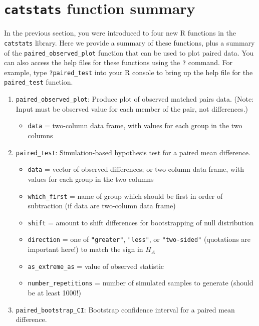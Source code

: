 \documentclass[
  10pt,
  openany]{book}
\providecommand{\tightlist}{%
  \setlength{\itemsep}{0pt}\setlength{\parskip}{0pt}}
\theoremstyle{definition}
\theoremstyle{definition}
\theoremstyle{definition}
\theoremstyle{definition}
\theoremstyle{remark}
\begin{document}
\section{\texorpdfstring{\texttt{catstats} function summary}{catstats function summary}}\label{catstats-function-summary-1}

In the previous section, you were introduced to four new R
functions in the \texttt{catstats} library. Here we provide a summary of
these functions, plus a summary of the \texttt{paired\_observed\_plot}
function that can be used to plot paired data. You can also access
the help files for these functions using the \texttt{?} command. For
example, type \texttt{?paired\_test} into your R console to bring up the
help file for the \texttt{paired\_test} function.

\begin{enumerate}
\def\labelenumi{\arabic{enumi}.}
\item
  \texttt{paired\_observed\_plot}: Produce plot of observed matched pairs data. (Note: Input must be observed value for each member of the pair, not differences.)

  \begin{itemize}
  \tightlist
  \item
    \texttt{data} = two-column data frame, with values for each group in the two columns
  \end{itemize}
\item
  \texttt{paired\_test}: Simulation-based hypothesis test for a paired mean difference.

  \begin{itemize}
  \tightlist
  \item
    \texttt{data} = vector of observed differences; or two-column data frame, with values for each group in the two columns
  \item
    \texttt{which\_first} = name of group which should be first in order of subtraction (if data are two-column data frame)\\
  \item
    \texttt{shift} = amount to shift differences for bootstrapping of null distribution
  \item
    \texttt{direction} = one of \texttt{"greater"}, \texttt{"less"}, or \texttt{"two-sided"} (quotations are important here!) to match the sign in \(H_A\)
  \item
    \texttt{as\_extreme\_as} = value of observed statistic
  \item
    \texttt{number\_repetitions} = number of simulated samples to generate (should be at least 1000!)
  \end{itemize}
\item
  \texttt{paired\_bootstrap\_CI}: Bootstrap confidence interval for a paired mean difference.


\end{enumerate}
\end{document}
